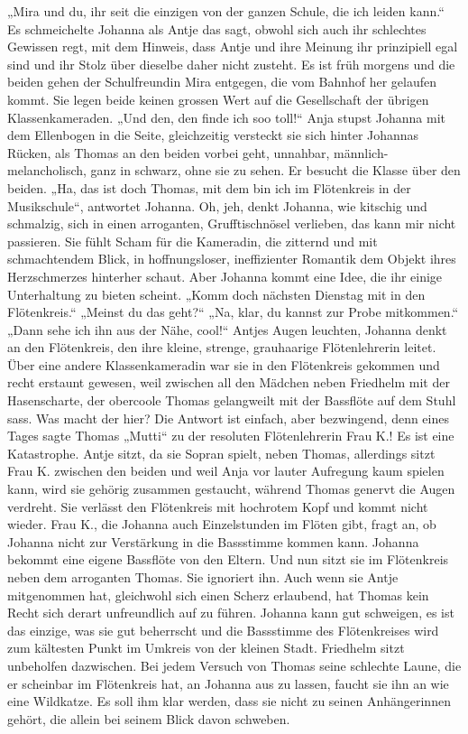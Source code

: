 „Mira und du, ihr seit die einzigen von der ganzen Schule, die ich leiden kann.“ Es schmeichelte Johanna als Antje das sagt, obwohl sich auch ihr schlechtes Gewissen regt, mit dem Hinweis, dass Antje und ihre Meinung ihr prinzipiell egal sind und ihr Stolz über dieselbe daher  nicht zusteht. Es ist früh morgens und die beiden gehen der Schulfreundin Mira entgegen, die vom Bahnhof her gelaufen kommt. Sie legen beide keinen grossen Wert auf die Gesellschaft der übrigen Klassenkameraden. „Und den, den finde ich soo toll!“ Anja stupst Johanna mit dem Ellenbogen in die Seite, gleichzeitig versteckt sie sich hinter Johannas Rücken, als Thomas an den beiden vorbei geht, unnahbar, männlich-melancholisch, ganz in schwarz, ohne sie zu sehen. Er besucht die Klasse über den beiden. „Ha, das ist doch Thomas, mit dem bin ich im Flötenkreis in der Musikschule“, antwortet Johanna. Oh, jeh, denkt Johanna, wie kitschig und schmalzig, sich in einen arroganten, Grufftischnösel verlieben, das kann mir nicht passieren. Sie fühlt Scham für die Kameradin, die zitternd und mit schmachtendem Blick, in hoffnungsloser, ineffizienter Romantik dem Objekt ihres Herzschmerzes hinterher schaut. Aber Johanna kommt eine Idee, die ihr einige Unterhaltung zu bieten scheint. „Komm doch nächsten Dienstag mit in den Flötenkreis.“ „Meinst du das geht?“ „Na, klar, du kannst zur Probe mitkommen.“ „Dann sehe ich ihn aus der Nähe, cool!“ Antjes Augen leuchten, Johanna denkt an den Flötenkreis, den ihre kleine, strenge, grauhaarige Flötenlehrerin leitet. Über eine andere Klassenkameradin war sie in den Flötenkreis gekommen und recht erstaunt gewesen, weil zwischen all den Mädchen neben Friedhelm mit der Hasenscharte, der obercoole Thomas gelangweilt mit der Bassflöte auf dem Stuhl sass. Was macht der hier? Die Antwort  ist einfach, aber bezwingend, denn eines Tages sagte Thomas „Mutti“ zu der resoluten Flötenlehrerin Frau K.!
Es ist eine Katastrophe. Antje sitzt, da sie Sopran spielt, neben Thomas, allerdings sitzt Frau K. zwischen den beiden und weil Anja vor lauter Aufregung kaum spielen kann, wird sie gehörig zusammen gestaucht, während Thomas genervt die Augen verdreht. Sie verlässt den Flötenkreis mit hochrotem Kopf und kommt nicht wieder. 
Frau K., die Johanna auch Einzelstunden im Flöten gibt, fragt an, ob Johanna nicht zur Verstärkung in die Bassstimme kommen kann. Johanna bekommt eine eigene Bassflöte von den Eltern. Und nun sitzt sie im Flötenkreis neben dem arroganten Thomas. Sie ignoriert ihn. Auch wenn sie Antje mitgenommen hat, gleichwohl sich einen Scherz erlaubend, hat Thomas kein Recht sich derart unfreundlich auf zu führen. Johanna kann gut schweigen, es ist das einzige, was sie gut beherrscht und die Bassstimme des Flötenkreises  wird zum kältesten Punkt im Umkreis von der kleinen Stadt. Friedhelm sitzt unbeholfen dazwischen. Bei jedem Versuch von Thomas seine schlechte Laune, die er scheinbar im Flötenkreis hat, an Johanna aus zu lassen, faucht sie ihn an wie eine Wildkatze. Es soll ihm klar werden, dass sie nicht zu seinen Anhängerinnen gehört, die allein bei seinem Blick davon schweben. 
